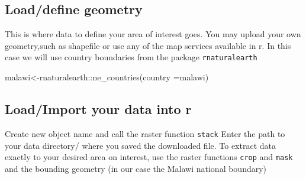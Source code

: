 \documentclass[
]{book}
\newenvironment{Shaded}{\begin{snugshade}}{\end{snugshade}}
\newcommand{\AttributeTok}[1]{\textcolor[rgb]{0.77,0.63,0.00}{#1}}
\newcommand{\FunctionTok}[1]{\textcolor[rgb]{0.00,0.00,0.00}{#1}}
\newcommand{\NormalTok}[1]{#1}
\newcommand{\OtherTok}[1]{\textcolor[rgb]{0.56,0.35,0.01}{#1}}
\newcommand{\SpecialCharTok}[1]{\textcolor[rgb]{0.00,0.00,0.00}{#1}}
\newcommand{\StringTok}[1]{\textcolor[rgb]{0.31,0.60,0.02}{#1}}
\begin{document}
\hypertarget{loaddefine-geometry}{%
\subsection{Load/define geometry}\label{loaddefine-geometry}}

This is where data to define your area of interest goes.
You may upload your own geometry,such as shapefile or use any of the map services available in r. In this case we will use country boundaries from the package \texttt{rnaturalearth}

\begin{Shaded}
\begin{Highlighting}[]
\NormalTok{malawi}\OtherTok{\textless{}{-}}\NormalTok{rnaturalearth}\SpecialCharTok{::}\FunctionTok{ne\_countries}\NormalTok{(}\AttributeTok{country =}\StringTok{\textquotesingle{}malawi\textquotesingle{}}\NormalTok{)}
\end{Highlighting}
\end{Shaded}

\hypertarget{loadimport-your-data-into-r}{%
\subsection{Load/Import your data into r}\label{loadimport-your-data-into-r}}

Create new object name and call the raster function \texttt{stack}
Enter the path to your data directory/ where you saved the downloaded file.
To extract data exactly to your desired area on interest, use the raster functions \texttt{crop} and \texttt{mask} and the bounding geometry (in our case the Malawi national boundary)
\end{document}
